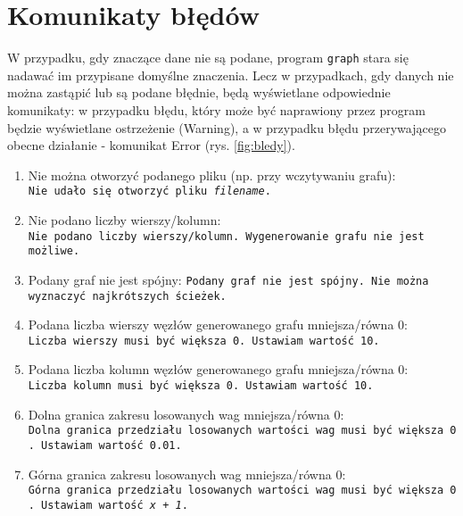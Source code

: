 \documentclass[]{article}
\begin{document}
\section{Komunikaty błędów}\label{header-n281}

W przypadku, gdy znaczące dane nie są podane, program \texttt{graph} stara się nadawać im przypisane domyślne znaczenia. Lecz w przypadkach, gdy danych nie można zastąpić lub są podane błędnie, będą wyświetlane odpowiednie komunikaty: w przypadku błędu, który może być naprawiony przez program będzie wyświetlane ostrzeżenie (Warning), a w przypadku błędu przerywającego obecne działanie - komunikat Error (rys. \ref{fig:bledy}).

\begin{enumerate}
\def\labelenumi{\arabic{enumi}.}
\item
  Nie można otworzyć podanego pliku (np. przy wczytywaniu grafu):
  \texttt{Nie\ udało\ się\ otworzyć\ pliku\ \emph{filename}.}
\item
  Nie podano liczby wierszy/kolumn:
  \texttt{Nie\ podano\ liczby\ wierszy\texttt{/}kolumn.\ Wygenerowanie\ grafu nie jest możliwe. }
\item
  Podany graf nie jest spójny:
  \texttt{Podany\ graf\ nie\ jest\ spójny.\ Nie można wyznaczyć najkrótszych ścieżek.}
\item
  Podana liczba wierszy węzłów generowanego grafu mniejsza/równa 0:
  \texttt{Liczba\ wierszy\ musi\ być\ większa\ 0.\ Ustawiam\ wartość\ 10.}
\item
  Podana liczba kolumn węzłów generowanego grafu mniejsza/równa 0:
  \texttt{Liczba\ kolumn\ musi\ być\ większa\ 0.\ Ustawiam\ wartość\ 10.}
\item
  Dolna granica zakresu losowanych wag mniejsza/równa 0:
  \texttt{Dolna\ granica\ przedziału\ losowanych\ wartości\ wag\ musi\ być\ większa\ 0.\ Ustawiam\ wartość\ 0.01.}
\item
  Górna granica zakresu losowanych wag mniejsza/równa 0:
  \texttt{Górna\ granica\ przedziału\ losowanych\ wartości\ wag\ musi\ być\ większa\ 0.\ Ustawiam\ wartość\ \emph{x + 1}.}
\end{enumerate}
\end{document}
